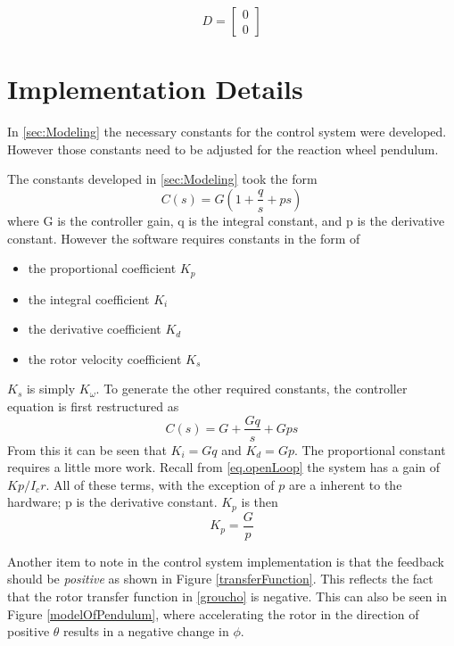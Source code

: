 \documentclass[12pt,letterpaper]{article}
\begin{document}
\begin{equation}
D = 
\begin{bmatrix}
0  \\
0 
\end{bmatrix}
\end{equation}





\section{Implementation Details}

In \autoref{sec:Modeling} the necessary constants for the control system were developed.  However those constants
need to be adjusted for the reaction wheel pendulum.

The constants developed in \autoref{sec:Modeling} took the form
\begin{equation}
	C(s) = G(1 + \frac{q}{s} + p s)
\end{equation}
where G is the controller gain, q is the integral constant, and p is the derivative constant.  However the software requires
constants in the form of 
\begin{itemize}
    \item the proportional coefficient $K_{p}$
    \item the integral coefficient $K_{i}$
    \item the derivative coefficient $K_{d}$
    \item the rotor velocity coefficient $K_{s}$
\end{itemize}

$K_{s}$ is simply $K_{\omega}$.  To generate the other required constants, the controller equation is first restructured as
\begin{equation}
	C(s) = G + \frac{Gq}{s} + Gps
\end{equation}
From this it can be seen that $K_{i} = Gq$ and $K_{d} = Gp$.  The proportional constant requires a little more work.
Recall from \eqref{eq.openLoop} the system has a gain of $Kp/I_{c}r$.  All of these terms, with the exception of $p$ are a inherent to the hardware; p
is the derivative constant. $K_{p}$ is then
\begin{equation}
K_{p} = \frac{G} {p}
\end{equation}

Another item to note in the control system implementation is that the feedback should be \textit{positive} as shown in Figure \ref{transferFunction}.  This reflects the fact that the rotor transfer function in \eqref{groucho} is negative.  This can also be seen in Figure \ref{modelOfPendulum}, where accelerating the rotor in the direction of positive $\theta$ results in a negative change in $\phi$.\\
\end{document}
